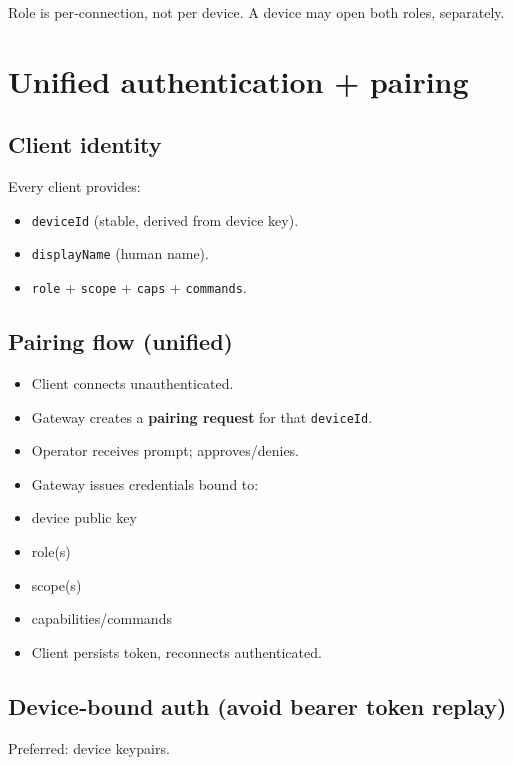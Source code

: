 Role is per‑connection, not per device. A device may open both roles, separately.

\hrulefill


\section{Unified authentication + pairing}


\subsection{Client identity}


Every client provides:

\begin{itemize}
  \item \texttt{deviceId} (stable, derived from device key).
  \item \texttt{displayName} (human name).
  \item \texttt{role} + \texttt{scope} + \texttt{caps} + \texttt{commands}.
\end{itemize}


\subsection{Pairing flow (unified)}


\begin{itemize}
  \item Client connects unauthenticated.
  \item Gateway creates a \textbf{pairing request} for that \texttt{deviceId}.
  \item Operator receives prompt; approves/denies.
  \item Gateway issues credentials bound to:
  \item device public key
  \item role(s)
  \item scope(s)
  \item capabilities/commands
  \item Client persists token, reconnects authenticated.
\end{itemize}


\subsection{Device‑bound auth (avoid bearer token replay)}


Preferred: device keypairs.

